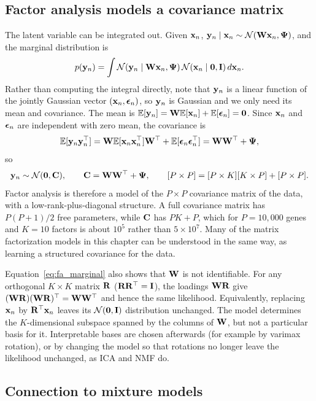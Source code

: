 \subsection{Factor analysis models a covariance matrix}

The latent variable can be integrated out. Given $\mathbf{x}_n$, $\mathbf{y}_n\mid\mathbf{x}_n\sim\mathcal{N}(\mathbf{W}\mathbf{x}_n,\boldsymbol{\Psi})$, and the marginal distribution is
\begin{equation}
  p(\mathbf{y}_n) = \int \mathcal{N}(\mathbf{y}_n\mid\mathbf{W}\mathbf{x}_n,\boldsymbol{\Psi})\,\mathcal{N}(\mathbf{x}_n\mid\mathbf{0},\mathbf{I})\,d\mathbf{x}_n.
\end{equation}
Rather than computing the integral directly, note that $\mathbf{y}_n$ is a linear function of the jointly Gaussian vector $(\mathbf{x}_n,\boldsymbol{\epsilon}_n)$, so $\mathbf{y}_n$ is Gaussian and we only need its mean and covariance. The mean is $\mathbb{E}[\mathbf{y}_n]=\mathbf{W}\mathbb{E}[\mathbf{x}_n]+\mathbb{E}[\boldsymbol{\epsilon}_n]=\mathbf{0}$. Since $\mathbf{x}_n$ and $\boldsymbol{\epsilon}_n$ are independent with zero mean, the covariance is
\begin{equation}
  \mathbb{E}[\mathbf{y}_n\mathbf{y}_n^\top] = \mathbf{W}\mathbb{E}[\mathbf{x}_n\mathbf{x}_n^\top]\mathbf{W}^\top + \mathbb{E}[\boldsymbol{\epsilon}_n\boldsymbol{\epsilon}_n^\top] = \mathbf{W}\mathbf{W}^\top+\boldsymbol{\Psi},
\end{equation}
so
\begin{equation}
  \mathbf{y}_n\sim\mathcal{N}(\mathbf{0},\mathbf{C}), \qquad \mathbf{C}=\mathbf{W}\mathbf{W}^\top+\boldsymbol{\Psi}, \qquad [P\times P]=[P\times K][K\times P]+[P\times P].
  \label{eq:fa_marginal}
\end{equation}
Factor analysis is therefore a model of the $P\times P$ covariance matrix of the data, with a low-rank-plus-diagonal structure. A full covariance matrix has $P(P+1)/2$ free parameters, while $\mathbf{C}$ has $PK+P$, which for $P=10{,}000$ genes and $K=10$ factors is about $10^5$ rather than $5\times10^7$. Many of the matrix factorization models in this chapter can be understood in the same way, as learning a structured covariance for the data.

Equation~\eqref{eq:fa_marginal} also shows that $\mathbf{W}$ is not identifiable. For any orthogonal $K\times K$ matrix $\mathbf{R}$ ($\mathbf{R}\mathbf{R}^\top=\mathbf{I}$), the loadings $\mathbf{W}\mathbf{R}$ give $(\mathbf{W}\mathbf{R})(\mathbf{W}\mathbf{R})^\top=\mathbf{W}\mathbf{W}^\top$ and hence the same likelihood. Equivalently, replacing $\mathbf{x}_n$ by $\mathbf{R}^\top\mathbf{x}_n$ leaves its $\mathcal{N}(\mathbf{0},\mathbf{I})$ distribution unchanged. The model determines the $K$-dimensional subspace spanned by the columns of $\mathbf{W}$, but not a particular basis for it. Interpretable bases are chosen afterwards (for example by varimax rotation), or by changing the model so that rotations no longer leave the likelihood unchanged, as ICA and NMF do.

\subsection{Connection to mixture models}

